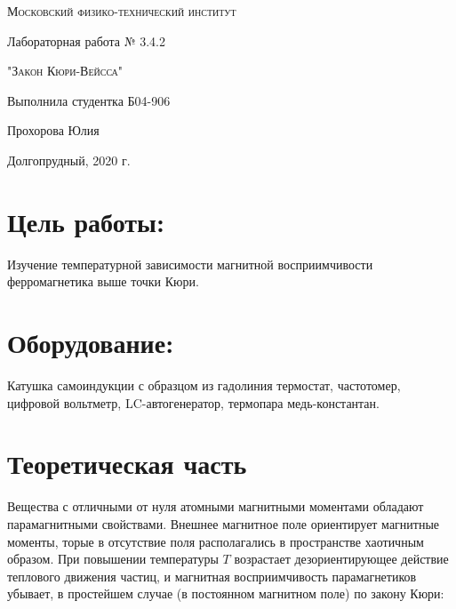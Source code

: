 \documentclass[12pt,a4paper]{article}
\begin{document}
\begin{titlepage}
	\centering
	\vspace{5cm}
	{\scshape\LARGE Московский физико-технический институт \par}
	\vspace{5cm}

	{\huge Лабораторная работа № 3.4.2 \par}
	\vspace{1cm}
	{\scshape\Large "Закон Кюри-Вейсса"\par}
	\vspace{2cm}
	\vfill
\begin{flushright}
	{\Large Выполнила студентка Б04-906}\par
	\vspace{0.3cm}
	{\LARGE Прохорова Юлия} \par

	
\end{flushright}
	

	\vfill\large

	Долгопрудный, 2020 г.
\end{titlepage}

\section{Цель работы:}
Изучение температурной зависимости магнитной восприимчивости ферромагнетика выше точки Кюри.

\section{Оборудование:}
Катушка самоиндукции с образцом из гадолиния термостат, частотомер, цифровой вольтметр, LC-автогенератор, термопара медь-константан.

\section{Теоретическая часть}

Вещества с отличными от нуля атомными магнитными моментами обладают парамагнитными свойствами. Внешнее магнитное поле ориентирует магнитные моменты, 
торые в отсутствие поля располагались в пространстве хаотичным образом. 
\hyphenation{}
При повышении температуры $T$ возрастает дезориентирующее действие теплового движения частиц, и магнитная восприимчивость парамагнетиков убывает, 
в простейшем случае (в постоянном магнитном поле) по закону Кюри:
\end{document}
